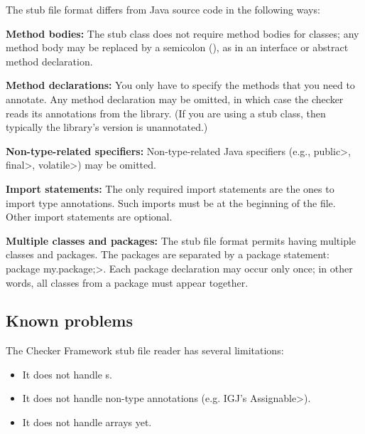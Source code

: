 The stub file format differs from Java source code in the following
ways:
\begin{description}

\item{\textbf{Method bodies:}}
  The stub class does not require method bodies for classes; any method
  body may be replaced by a semicolon (\code{;}), as in an interface or
  abstract method declaration.

\item{\textbf{Method declarations:}}
  You only have to specify the methods that you need to annotate.
  Any method declaration may be omitted, in which case the checker reads
  its annotations from the library.  (If you are using a stub class, then
  typically the library's version is unannotated.)

\item{\textbf{Non-type-related specifiers:}}
  Non-type-related Java specifiers (e.g., \<public>, \<final>, \<volatile>)
  may be omitted.

\item{\textbf{Import statements:}}
  The only required import statements are the ones to import type
  annotations.  Such imports must be at the beginning of the
  file.  Other import statements are optional.

\item{\textbf{Multiple classes and packages:}}
  The stub file format permits having multiple classes and packages.
  The packages are separated by a package statement:
  \<package my.package;>.  Each package declaration may occur only once; in
  other words, all classes from a package must appear together.

\end{description}


\subsection{Known problems}


The Checker Framework stub file reader has several limitations:

\begin{itemize}
\item
  It does not handle s.
\item
  It does not handle non-type annotations (e.g. IGJ's \<Assignable>).
\item
  It does not handle arrays yet.
\end{itemize}


